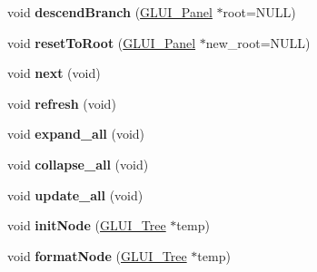 \begin{DoxyCompactItemize}
\item 
\hypertarget{classGLUI__TreePanel_a2db40b406b533cbb37a815ec6b40b9d9}{void {\bfseries descend\-Branch} (\hyperlink{classGLUI__Panel}{G\-L\-U\-I\-\_\-\-Panel} $\ast$root=N\-U\-L\-L)}\label{classGLUI__TreePanel_a2db40b406b533cbb37a815ec6b40b9d9}

\item 
\hypertarget{classGLUI__TreePanel_afb0e79d1dc91dc54a68b1a8713b8c304}{void {\bfseries reset\-To\-Root} (\hyperlink{classGLUI__Panel}{G\-L\-U\-I\-\_\-\-Panel} $\ast$new\-\_\-root=N\-U\-L\-L)}\label{classGLUI__TreePanel_afb0e79d1dc91dc54a68b1a8713b8c304}

\item 
\hypertarget{classGLUI__TreePanel_a1f7f1fbf6bc2981fcbc6e18d411282ec}{void {\bfseries next} (void)}\label{classGLUI__TreePanel_a1f7f1fbf6bc2981fcbc6e18d411282ec}

\item 
\hypertarget{classGLUI__TreePanel_a2ee78d8dc12158d0a238352b64fc8c40}{void {\bfseries refresh} (void)}\label{classGLUI__TreePanel_a2ee78d8dc12158d0a238352b64fc8c40}

\item 
\hypertarget{classGLUI__TreePanel_a8d49fb5df0741d2e5f00e90312f8c485}{void {\bfseries expand\-\_\-all} (void)}\label{classGLUI__TreePanel_a8d49fb5df0741d2e5f00e90312f8c485}

\item 
\hypertarget{classGLUI__TreePanel_aa0734d6f9d1ffb0b936207862931b369}{void {\bfseries collapse\-\_\-all} (void)}\label{classGLUI__TreePanel_aa0734d6f9d1ffb0b936207862931b369}

\item 
\hypertarget{classGLUI__TreePanel_ad47d4b3fc3126d22de92a69f1acfdbc0}{void {\bfseries update\-\_\-all} (void)}\label{classGLUI__TreePanel_ad47d4b3fc3126d22de92a69f1acfdbc0}

\item 
\hypertarget{classGLUI__TreePanel_acad3e81a379af8d21c03b142e383d25e}{void {\bfseries init\-Node} (\hyperlink{classGLUI__Tree}{G\-L\-U\-I\-\_\-\-Tree} $\ast$temp)}\label{classGLUI__TreePanel_acad3e81a379af8d21c03b142e383d25e}

\item 
\hypertarget{classGLUI__TreePanel_abb0fcb52726f6253858721959cd3279a}{void {\bfseries format\-Node} (\hyperlink{classGLUI__Tree}{G\-L\-U\-I\-\_\-\-Tree} $\ast$temp)}\label{classGLUI__TreePanel_abb0fcb52726f6253858721959cd3279a}

\end{DoxyCompactItemize}

